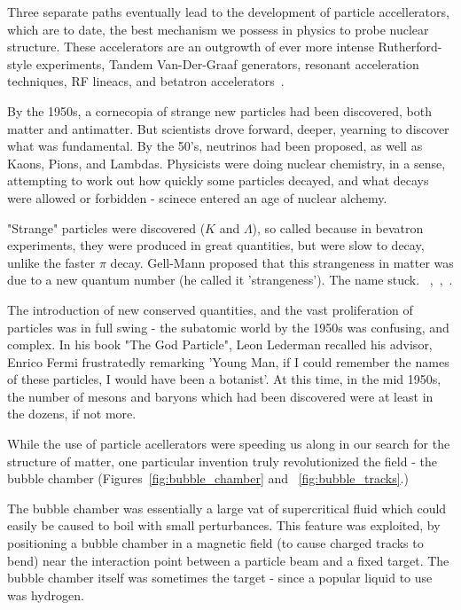 Three separate paths eventually lead to the development of particle
accellerators, which are to date, the best mechanism we possess in physics to
probe nuclear structure. These accelerators are an outgrowth
of ever more intense Rutherford-style experiments, Tandem Van-Der-Graaf
generators, resonant acceleration techniques, RF lineacs, and betatron
accelerators~\cite{Bryant1994}.

By the 1950s, a cornecopia of strange new particles had been discovered, both
matter and antimatter. But scientists drove forward, deeper, yearning to
discover what was fundamental. By the 50's, neutrinos had been proposed, as well
as Kaons, Pions, and Lambdas. Physicists were doing nuclear chemistry, in a
sense, attempting to work out how quickly some particles decayed, and what
decays were allowed or forbidden - scinece entered an age of nuclear alchemy.

"Strange" particles were discovered ($K$ and $\Lambda$), so called because in
bevatron experiments, they were produced in great quantities, but were slow to
decay, unlike the faster $\pi$ decay. Gell-Mann proposed that this strangeness
in matter was due to a new quantum number (he called it 'strangeness'). The name
stuck.
~\cite{Gell-Mann1953},~\cite{Gell-Mann1956},~\cite{KraussParticleHistory}.

The introduction of new conserved quantities, and the vast proliferation of
particles was in full swing - the subatomic world by the 1950s was confusing,
and complex. In his book "The God Particle", Leon Lederman recalled his advisor,
Enrico Fermi frustratedly remarking 'Young Man, if I could remember the names of
these particles, I would have been a botanist'. At this time, in the mid 1950s,
the number of mesons and baryons which had been discovered were at least in the
dozens, if not more.

While the use of particle acellerators were speeding us along in  our search for
the structure of matter, one particular invention truly revolutionized the
field - the bubble chamber (Figures~\ref{fig:bubble_chamber} and
~\ref{fig:bubble_tracks}.)

The bubble chamber was essentially a large vat of supercritical fluid which
could easily be caused to boil with small perturbances. This feature was
exploited, by positioning a bubble chamber in a magnetic field (to cause charged
tracks to bend) near the interaction point between a particle beam and a fixed
target. The bubble chamber itself was sometimes the target - since a popular
liquid to use was hydrogen. 

